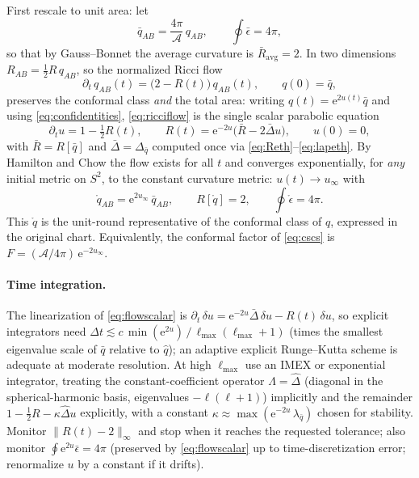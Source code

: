 \documentclass[11pt]{article}
\newcommand{\ee}{\mathrm{e}}
\newcommand{\qo}{\mathring{q}}          %
\newcommand{\epso}{\mathring{\epsilon}} %
\begin{document}
First rescale to unit area: let
\begin{equation}
  \bar q_{AB} = \frac{4\pi}{\mathcal{A}}\, q_{AB},
  \qquad \oint \bar\epsilon = 4\pi,
\end{equation}
so that by Gauss--Bonnet the average curvature is
$\bar R_{\mathrm{avg}} = 2$.  In two dimensions $R_{AB} = \tfrac12 R\,
q_{AB}$, so the normalized Ricci flow
\begin{equation}
  \partial_t\, q_{AB}(t) = \bigl(2 - R(t)\bigr)\, q_{AB}(t),
  \qquad q(0) = \bar q,
  \label{eq:ricciflow}
\end{equation}
preserves the conformal class \emph{and} the total area: writing
$q(t) = \ee^{2u(t)}\bar q$ and using \eqref{eq:confidentities},
\eqref{eq:ricciflow} is the single scalar parabolic equation
\begin{equation}
  \boxed{\;
  \partial_t u = 1 - \tfrac12 R(t),
  \qquad
  R(t) = \ee^{-2u}\bigl(\bar R - 2\bar\Delta u\bigr),
  \qquad u(0)=0,
  \;}
  \label{eq:flowscalar}
\end{equation}
with $\bar R = R[\bar q]$ and $\bar\Delta = \Delta_{\bar q}$ computed once via
\eqref{eq:Reth}--\eqref{eq:lapeth}.  By Hamilton and Chow
\cite{hamilton1988,chow1991} the flow exists for all $t$ and converges
exponentially, for \emph{any} initial metric on $S^2$, to the constant
curvature metric: $u(t)\to u_\infty$ with
\begin{equation}
  \qo_{AB} = \ee^{2u_\infty}\,\bar q_{AB},
  \qquad R[\qo] = 2,\qquad \oint\epso = 4\pi .
\end{equation}
This $\qo$ is the unit-round representative of the conformal class of $q$,
expressed in the original chart.  Equivalently, the conformal factor of
\eqref{eq:cscs} is $F = (\mathcal{A}/4\pi)\,\ee^{-2u_\infty}$.

\paragraph{Time integration.}
The linearization of \eqref{eq:flowscalar} is
$\partial_t\,\delta u = \ee^{-2u}\bar\Delta\,\delta u - R(t)\,\delta u$,
so explicit integrators need
$\Delta t \lesssim c\,\min(\ee^{2u})\,/\,\ell_{\max}(\ell_{\max}+1)$
(times the smallest eigenvalue scale of $\bar q$ relative to $\hat q$); an
adaptive explicit Runge--Kutta scheme is adequate at moderate resolution.  At
high $\ell_{\max}$ use an IMEX or exponential integrator, treating the
constant-coefficient operator $\Lambda = \hat\Delta$ (diagonal in the
spherical-harmonic basis, eigenvalues $-\ell(\ell+1)$) implicitly and the
remainder $1 - \tfrac12 R - \kappa\hat\Delta u$ explicitly, with a constant
$\kappa \approx \max(\ee^{-2u}\,\lambda_{\bar q})$ chosen for stability.
Monitor $\lVert R(t)-2\rVert_\infty$ and stop when it reaches the requested
tolerance; also monitor $\oint \ee^{2u}\bar\epsilon = 4\pi$ (preserved by
\eqref{eq:flowscalar} up to time-discretization error; renormalize $u$ by a
constant if it drifts).
\end{document}
